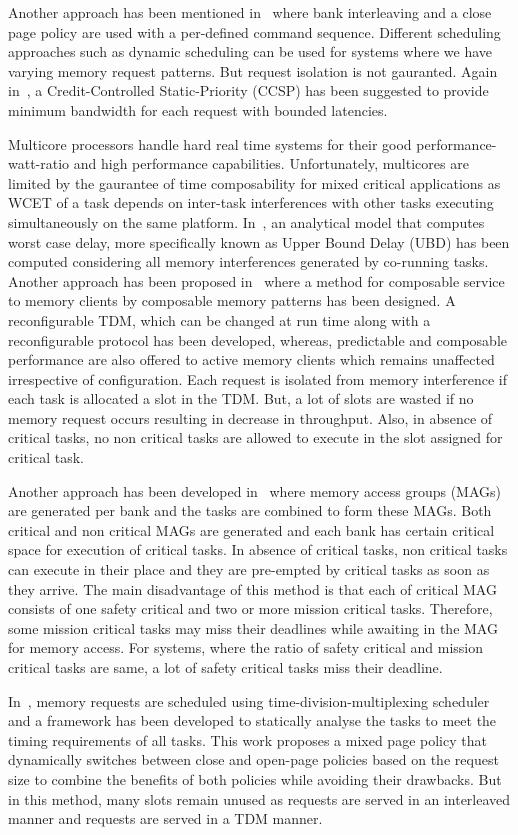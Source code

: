 \noindent
Another approach has been mentioned in~\cite{akesson2011architectures} where bank interleaving and a close page policy are used with a per-defined 
command sequence. Different scheduling approaches such as dynamic scheduling can be used for systems where we have varying 
memory request patterns. But request isolation is not gauranted. Again in~\cite{akesson2008real}, a Credit-Controlled Static-Priority
(CCSP) has been suggested to provide minimum bandwidth for each request with bounded latencies. 

\noindent
Multicore processors handle hard real time systems for their good performance-watt-ratio and high performance capabilities.
Unfortunately, multicores are limited by the gaurantee of time composability for mixed critical applications as WCET of a task 
depends on inter-task interferences with other tasks executing simultaneously on the same platform. 
In~\cite{paolieri2013timing}, an analytical model that computes worst case delay, more specifically known as Upper Bound 
Delay (UBD) has been computed considering all memory interferences generated by co-running tasks. Another approach has been 
proposed in~\cite{goossens2013reconfigurable} where a method for composable service to memory clients by composable memory 
patterns has been designed. A reconfigurable TDM, which can be changed at run time along with a reconfigurable protocol has 
been developed, whereas, predictable and composable performance are also offered to active memory clients which remains 
unaffected irrespective of configuration. Each request is isolated from memory interference if each task is allocated 
a slot in the TDM. But, a lot of slots are wasted if no memory request occurs resulting in decrease in throughput. Also, in 
absence of critical tasks, no non critical tasks are allowed to execute in the slot assigned for critical task.

\noindent
Another approach has been developed in~\cite{kim2015predictable} where memory access groups (MAGs) are generated per bank 
and the tasks are combined to form these MAGs. Both critical and non critical MAGs are generated and each bank has certain 
critical space for execution of critical tasks. In absence of critical tasks, non critical tasks can execute in their place 
and they are pre-empted by critical tasks as soon as they arrive. The main disadvantage of this method is that each 
of critical MAG consists of one safety critical and two or more mission critical tasks. Therefore, some mission critical 
tasks may miss their deadlines while awaiting in the MAG for memory access. For systems, where the ratio of safety 
critical and mission critical tasks are same, a lot of safety critical tasks miss their deadline. 

\noindent
In~\cite{hassan2017predictable}, memory requests are scheduled using time-division-multiplexing scheduler and a framework 
has been developed to statically analyse the tasks to meet the timing requirements of all tasks. This work proposes a
mixed page policy that dynamically switches between close and open-page policies based on the request size to combine the 
benefits of both policies while avoiding their drawbacks. But in this method, many slots remain unused as requests are 
served in an interleaved manner and requests are served in a TDM manner.

